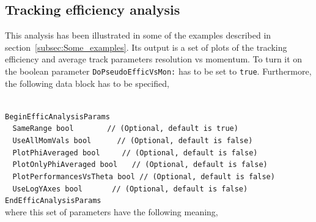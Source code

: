 \subsection{Tracking efficiency analysis}

This analysis has been illustrated in some of the examples described in section~\ref{subsec:Some_examples}. Its output is a set of plots of the tracking efficiency and average track parameters 
resolution vs momentum. To turn it on the boolean parameter {\tt DoPseudoEfficVsMon:} has to be set to {\tt true}. Furthermore, the following data block has to be specified,

~\\
\noindent
{\tt BeginEfficAnalysisParams} \\
$~~~~${\tt SameRange                bool     $~~~~~~~~~~~~~$ // (Optional, default is true) } \\
$~~~~${\tt UseAllMomVals            bool         $~~~~~~~~~$ // (Optional, default is false)} \\
$~~~~${\tt PlotPhiAveraged          bool           $~~~~~~~$ // (Optional, default is false)} \\
$~~~~${\tt PlotOnlyPhiAveraged      bool               $~~~$ // (Optional, default is false)} \\
$~~~~${\tt PlotPerformancesVsTheta  bool                     // (Optional, default is false)} \\
$~~~~${\tt UseLogYAxes              bool       $~~~~~~~~~~~$ // (Optional, default is false)} \\
{\tt EndEfficAnalysisParams} \\

\noindent
where this set of parameters have the following meaning,

